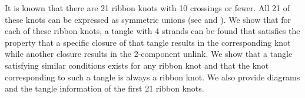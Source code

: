 
\diagrams
\theorems

\begin{paperabs}
It is known that there are 21 ribbon knots with 10 crossings or fewer.
All 21 of these knots can be expressed as symmetric unions (see \cite{many} and
\cite{one}).
We show that for each of these ribbon knots, a tangle with 4 strands can be
found that satisfies the property that a specific closure of that tangle results
in the corresponding knot while another closure results in the 2-component
unlink.
We show that a tangle satisfying similar conditions exists for any ribbon knot
and that the knot corresponding to such a tangle is always a ribbon knot.
We also provide diagrams and the tangle information of the first 21 ribbon
knots.
\end{paperabs}
